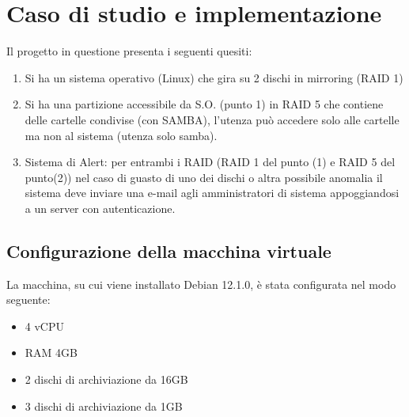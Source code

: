 \documentclass[11pt]{article}
\begin{document}
\section{Caso di studio e implementazione}
Il progetto in questione presenta i seguenti quesiti:
\begin{enumerate}
    \item Si ha un sistema operativo (Linux) che gira su 2 dischi in mirroring (RAID 1)
    \item Si ha una partizione accessibile da S.O. (punto 1) in RAID 5 che contiene delle cartelle condivise (con SAMBA), l'utenza può accedere solo alle cartelle ma non al sistema (utenza solo samba).
    \item Sistema di Alert: per entrambi i RAID (RAID 1 del punto (1) e RAID 5 del punto(2)) nel caso di guasto di uno dei dischi o altra possibile anomalia il sistema deve inviare una e-mail agli amministratori di sistema
appoggiandosi a un server con autenticazione.
\end{enumerate}

\subsection{Configurazione della macchina virtuale}
La macchina, su cui viene installato Debian 12.1.0, è stata configurata nel modo seguente:
\begin{itemize}
    \item 4 vCPU
    \item RAM 4GB
    \item 2 dischi di archiviazione da 16GB
    \item 3 dischi di archiviazione da 1GB
\end{itemize}
\end{document}
